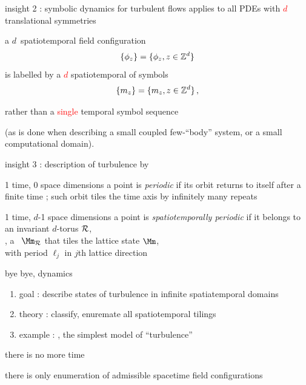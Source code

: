 \begin{frame}{insight 2 : symbolic dynamics for turbulent flows}
applies to
all PDEs with \textcolor{red}{$d$} translational symmetries

\bigskip

a $d$\dmn\ spatiotemporal field configuration
\[
\{\phi_{z}\} = \{\phi_{z},  z\in \mathbb{Z}^{d}  \}
\]
is labelled by a \textcolor{red}{$d$\dmn} {spatiotemporal
{\brick}} of symbols
\[
\{m_{z}\} = \{m_{z}, z\in \mathbb{Z}^{d}\}
\,,
\]

\bigskip

rather than a \textcolor{red}{single} temporal symbol sequence

\bigskip

(as is done when describing a small coupled few-``body'' system, or a
small computational domain).
\end{frame} %


\begin{frame}{insight 3 : description of turbulence by \twots}
\begin{block}{1 time, 0 space dimensions}
a {\statesp} point is {\em periodic} if its orbit returns to itself
after a finite time \period{}; such orbit tiles the time axis
by infinitely many repeats
\end{block}

\bigskip

\begin{block}{1 time, $d$-1 space dimensions}
 a {\statesp} point is {\em spatiotemporally periodic} if
it belongs to \\ an invariant $d$-torus ${\mathcal{R}}$,\\
\ie, a \brick\ $\Mm_{\R}$ that
tiles the lattice state  $\Mm$, \\
with period $\ell_j$ in $j$th lattice direction
\end{block}
\end{frame} %

\begin{frame}{bye bye, dynamics}
\begin{enumerate}
              \item
goal : describe states of turbulence in infinite spatiatemporal domains
              \item
theory : classify, enuremate all spatiotemporal tilings
              \item
example : \catlatt, the simplest model of ``turbulence''
\end{enumerate}

\vfill

there is no more time

\medskip

there is only enumeration of admissible spacetime field configurations
\end{frame} %


